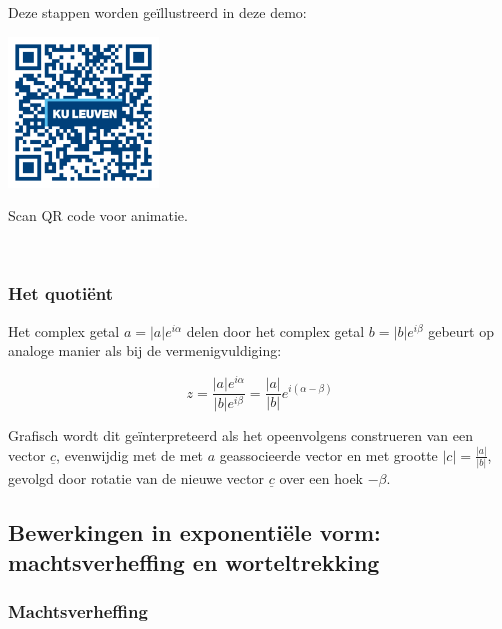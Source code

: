 Deze stappen worden ge\"{i}llustreerd in deze demo:\\

\begin{minipage}{.25\linewidth}
	\raggedright
	\includegraphics[width=4cm]{3_gonio_complexe_getallen/inputs/QR_Code_ANIMATIE4_module3new}
\end{minipage}
\begin{minipage}{.7\linewidth}
	Scan QR code voor animatie.
\end{minipage}    \\

\subsubsection{Het quoti\"{e}nt}

Het complex getal $a=|a|e^{i\alpha}$ delen door het complex getal $b=|b|e^{i\beta}$ gebeurt op analoge manier als bij de vermenigvuldiging:\\

\begin{eigenschap}
	\begin{framed}
	\[ z=\frac{|a|e^{i\alpha}}{|b|e^{i\beta}}=\frac{|a|}{|b|}e^{i (\alpha - \beta)}  \]
\end{framed}
\end{eigenschap}

Grafisch wordt dit ge\"{i}nterpreteerd als het opeenvolgens construeren van een vector $\underline{c}$, evenwijdig met de met $a$ geassocieerde vector en met grootte $|c|=\frac{|a|}{|b|}$, gevolgd door rotatie van de nieuwe vector $\underline{c}$ over een hoek $-\beta$.\\

\subsection{Bewerkingen in exponenti\"{e}le vorm: machtsverheffing en worteltrekking}

\subsubsection{Machtsverheffing}

